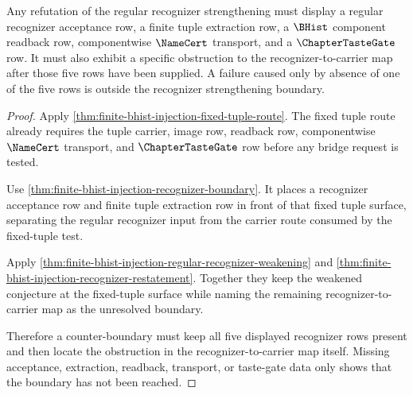 \begin{theorem}
\label{thm:finite-bhist-injection-recognizer-counter-boundary}
Any refutation of the regular recognizer strengthening must display a regular recognizer acceptance row, a finite tuple extraction row, a $\BHist$ component readback row, componentwise $\NameCert$ transport, and a $\ChapterTasteGate$ row. It must also exhibit a specific obstruction to the recognizer-to-carrier map after those five rows have been supplied. A failure caused only by absence of one of the five rows is outside the recognizer strengthening boundary.
\end{theorem}
\begin{proof}
Apply \autoref{thm:finite-bhist-injection-fixed-tuple-route}. The fixed tuple route already requires the tuple carrier, image row, readback row, componentwise $\NameCert$ transport, and $\ChapterTasteGate$ row before any bridge request is tested.

Use \autoref{thm:finite-bhist-injection-recognizer-boundary}. It places a recognizer acceptance row and finite tuple extraction row in front of that fixed tuple surface, separating the regular recognizer input from the carrier route consumed by the fixed-tuple test.

Apply \autoref{thm:finite-bhist-injection-regular-recognizer-weakening} and \autoref{thm:finite-bhist-injection-recognizer-restatement}. Together they keep the weakened conjecture at the fixed-tuple surface while naming the remaining recognizer-to-carrier map as the unresolved boundary.

Therefore a counter-boundary must keep all five displayed recognizer rows present and then locate the obstruction in the recognizer-to-carrier map itself. Missing acceptance, extraction, readback, transport, or taste-gate data only shows that the boundary has not been reached.
\end{proof}

